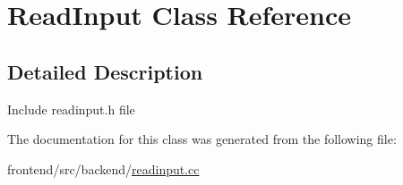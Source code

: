 \hypertarget{classReadInput}{\section{Read\-Input Class Reference}
\label{classReadInput}
}


\subsection{Detailed Description}
Include readinput.\-h file 

The documentation for this class was generated from the following file\-:\begin{DoxyCompactItemize}
\item 
frontend/src/backend/\hyperlink{readinput_8cc}{readinput.\-cc}\end{DoxyCompactItemize}
